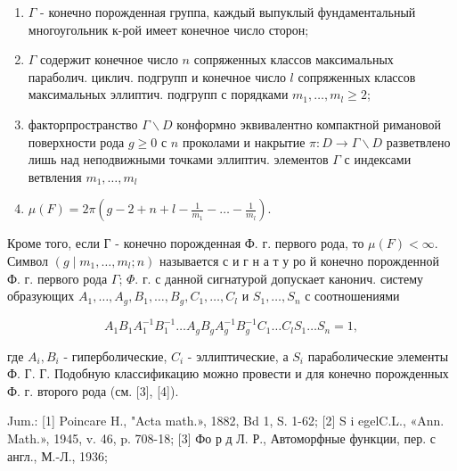 \documentclass[10pt]{article}
\begin{document}
\begin{enumerate}

  \item $\Gamma$ - конечно порожденная группа, каждый выпуклый фундаментальный многоугольник к-рой имеет конечное число сторон;



  \item $\Gamma$ содержит конечное число $n$ сопряженных классов максимальных параболич. циклич. подгрупп и конечное число $l$ сопряженных классов максимальных эллиптич. подгрупп с порядками $m_{1}, \ldots, m_{l} \geqslant 2$;



  \item факторпространство $\Gamma \backslash D$ конформно эквивалентно компактной римановой поверхности рода $g \geqslant 0$ с $n$ проколами и накрытие $\pi: D \rightarrow \Gamma \backslash D$ разветвлено лишь над неподвижными точками эллиптич. элементов $\Gamma$ с индексами ветвления $m_{1}, \ldots, m_{l}$



  \item $\mu(F)=2 \pi\left(g-2+n+l-\frac{1}{m_{1}}-\ldots-\frac{1}{m_{l}}\right)$.



\end{enumerate}



Кроме того, если Г - конечно порожденная Ф. г. первого рода, то $\mu(F)<\infty$. Символ $\left(g \mid m_{1}, \ldots, m_{l} ; n\right)$ называется с и г н а т у ро й конечно порожденной Ф. г. первого рода $\Gamma$; $\Phi$. г. с данной сигнатурой допускает канонич. систему образующих $A_{1}, \ldots, A_{g}, B_{1}, \ldots, B_{g}, C_{1}, \ldots, C_{l}$ и $S_{1}, \ldots, S_{n}$ с соотношениями



\[

A_{1} B_{1} A_{1}^{-1} B_{1}^{-1} \ldots A_{g} B_{g} A_{g}^{-1} B_{g}^{-1} C_{1} \ldots C_{l} S_{1} \ldots S_{n}=1,

\]



где $A_{i}, B_{i}$ - гиперболические, $C_{i}$ - эллиптические, а $S_{i}$ параболические элементы Ф. Г. Г. Подобную классификацию можно провести и для конечно порожденных Ф. г. второго рода (см. [3], [4]).



Jum.: [1] Poincare H., "Acta math.», 1882, Bd 1, S. 1-62; [2] S i egelC.L., «Ann. Math.», 1945, v. 46, p. 708-18; [3] Фо р д Л. Р., Автоморфные функции, пер. с англ., М.-Л., 1936;
\end{document}
